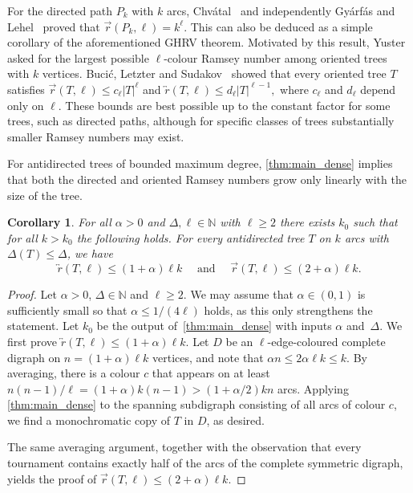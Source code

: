 \documentclass[11pt]{article}
\newtheorem{corollary}[theorem]{Corollary}
\numberwithin{equation}{section}
\renewcommand{\geq}{\geqslant}
\renewcommand{\leq}{\leqslant}
\def\NN{\mathbb N}
\theoremstyle{definition}
\begin{document}
For the directed path $P_k$ with $k$ arcs, Chv\'atal~\cite{chvatal1972monochromatic} and independently Gy\'arf\'as and Lehel~\cite{gyarfas1973ramsey} proved that $\overrightarrow r(P_k,\ell)=k^\ell$. This can also be deduced as a simple corollary of the aforementioned GHRV theorem.
Motivated by this result, Yuster~\cite{yuster2017ramsey} asked for the largest possible $\ell$-colour Ramsey number among oriented trees with $k$ vertices. Buci\'c, Letzter and Sudakov~\cite{bucic2017directed} showed that every oriented tree $T$ satisfies
$\overrightarrow r(T,\ell)\le c_\ell|T|^\ell $
and
$\overleftrightarrow r(T,\ell)\le d_\ell|T|^{\ell-1},$
where $c_\ell$ and $d_\ell$ depend only on $\ell$. These bounds are best possible up to the constant factor for some trees, such as directed paths, although for specific classes of trees substantially smaller Ramsey numbers may exist.

For antidirected trees of bounded maximum degree, \cref{thm:main_dense} implies that both the directed and oriented Ramsey numbers grow only linearly with the size of the tree.

\begin{corollary}
    For all $\alpha>0$ and $\Delta,\ell \in \NN$ with $\ell\geq 2$ there exists $k_0$ such that for all $k>k_0$ the following holds. For every antidirected tree $T$ on $k$ arcs with $\Delta(T)\leq \Delta$, we have 
    \begin{equation*}
        \overleftrightarrow{r}(T,\ell)\leq (1+\alpha)\ell k \quad \text{ and } \quad \overrightarrow r(T,\ell)\le (2+\alpha)\ell k.
    \end{equation*}
\end{corollary}

\begin{proof}
    Let $\alpha>0$, $\Delta\in \NN$ and $\ell \geq 2$.
    We may assume that $\alpha\in (0,1)$ is sufficiently small so that $\alpha\leq 1/(4\ell)$ holds, as this only strengthens the statement. Let $k_0$ be the output of~\cref{thm:main_dense} with inputs $\alpha$ and~$\Delta$.  
    We first prove $\overleftrightarrow{r}(T,\ell)\leq (1+\alpha)\ell k$.
    Let $D$ be an $\ell$-edge-coloured complete digraph on $n = (1+\alpha)\ell k$ vertices, and note that $\alpha n \leq 2\alpha \ell k \leq k$. By averaging, there is a colour $c$ that appears on at least $n(n-1)/\ell = (1+\alpha)k(n-1)> (1+\alpha/2)kn$ arcs. Applying \cref{thm:main_dense} to the spanning subdigraph consisting of all arcs of colour $c$, we find a monochromatic copy of $T$ in $D$, as desired.

    The same averaging argument, together with the observation that every tournament contains exactly half of the arcs of the complete symmetric digraph, yields the proof of $\overrightarrow r(T,\ell)\le (2+\alpha)\ell k$.
\end{proof}
\end{document}
